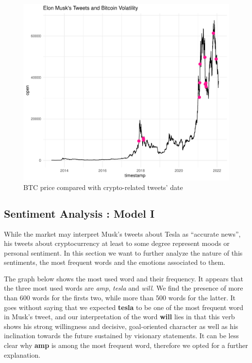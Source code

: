 \documentclass[
]{article}
\begin{document}
\begin{figure}
\centering
\includegraphics{Trial1_files/figure-latex/fig3-1.pdf}
\caption{\label{fig:fig3}BTC price compared with crypto-related tweets'
date}
\end{figure}

\hypertarget{sentiment-analysis-model-i}{%
\subsection{Sentiment Analysis : Model
I}\label{sentiment-analysis-model-i}}

While the market may interpret Musk's tweets about Tesla as ``accurate
news'', his tweets about cryptocurrency at least to some degree
represent moods or personal sentiment. In this section we want to
further analyze the nature of this sentiments, the most frequent words
and the emotions associated to them.

The graph below shows the most used word and their frequency. It appears
that the three most used words are \emph{amp}, \emph{tesla} and
\emph{will}. We find the presence of more than 600 words for the firsts
two, while more than 500 words for the latter. It goes without saying
that we expected \textbf{tesla} to be one of the most frequent word in
Musk's tweet, and our interpretation of the word \textbf{will} lies in
that this verb shows his strong willingness and decisive, goal-oriented
character as well as his inclination towards the future sustained by
visionary statements. It can be less clear why \textbf{amp} is among the
most frequent word, therefore we opted for a further explanation.
\end{document}
